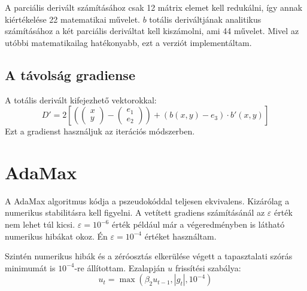 A parciális derivált számításához csak 12 mátrix elemet kell redukálni, így annak kiértékelése 22 matematikai művelet. $b$ totális deriváltjának analitikus számításához a két parciális deriváltat kell kiszámolni, ami 44 művelet. Mivel az utóbbi matematikailag hatékonyabb, ezt a verziót implementáltam.

\subsection{A távolság gradiense}
A totális derivált kifejezhető vektorokkal:
$$ D' = 2\left[\left(\begin{pmatrix} x \\ y \end{pmatrix} - \begin{pmatrix} e_1 \\ e_2  \end{pmatrix}\right)  + (b(x,y)-e_3)\cdot b'(x,y) \right]$$
Ezt a gradienst használjuk az iterációs módszerben. 


\section{AdaMax}
A AdaMax algoritmus kódja a pszeudokóddal teljesen ekvivalens. Kizárólag a numerikus stabilitásra kell figyelni. A vetített gradiens számításánál az $\varepsilon$ érték nem lehet túl kicsi. $\varepsilon = 10^{-6}$ érték például már a végeredményben is látható numerikus hibákat okoz. Én $\varepsilon = 10^{-4}$ értéket használtam.

Szintén numerikus hibák és a zéróosztás elkerülése végett a tapasztalati szórás minimumát is $10^{-4}$-re állítottam. Ezalapján $u$ frissítési szabálya: 
$$ u_t = \max (\beta_2 u_{t-1}, |g_t|, 10^{-4}) $$


